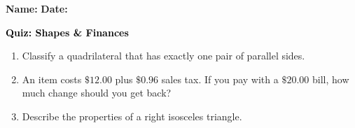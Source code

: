 \documentclass[12pt, letterpaper, fleqn]{article}
\begin{document}
\textbf{Name:} \underline{\hspace{5cm}}
\hfill
\textbf{Date:} \underline{\hspace{3cm}}\\

\begin{tcolorbox}[colback=customteal!20]
    \large\textcolor{black}{\textbf{Quiz: Shapes \& Finances}}
\end{tcolorbox}
\begin{enumerate}[itemsep=3.5cm, leftmargin=0.6cm]
\item Classify a quadrilateral that has exactly one pair of parallel sides.
\vspace{3.5cm}
\item An item costs $\$12.00$ plus $\$0.96$ sales tax. If you pay with a $\$20.00$ bill, how much change should you get back?
\vspace{3.5cm}
\item Describe the properties of a right isosceles triangle.
\end{enumerate}
\end{document}
